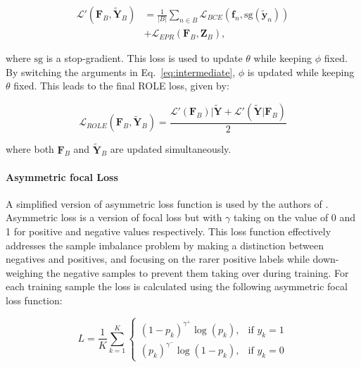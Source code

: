 \documentclass[lettersize,journal]{IEEEtran}
\begin{document}
\begin{equation}
    \label{eq:intermediate}
    \begin{aligned}
        \mathcal{L}'(\mathbf{F}_B,\tilde{\mathbf{Y}}_B) &= \frac{1}{|B|}\sum_{n\in B} \mathcal{L}_{BCE}(\mathbf{f}_n,\text{sg}(\tilde{\mathbf{y}}_n)) \\
        &+ \mathcal{L}_{EPR}(\mathbf{F}_B,\mathbf{Z}_B)\text{,}
    \end{aligned}
\end{equation}

\noindent where $\text{sg}$ is a stop-gradient. This loss is used to update $\theta$ while keeping $\phi$ fixed. By switching the arguments in Eq.~\ref{eq:intermediate}, $\phi$ is updated while keeping $\theta$ fixed. This leads to the final ROLE loss, given by:

\begin{equation}
    \label{eq:role}
    \mathcal{L}_{ROLE}(\mathbf{F}_B, \mathbf{\tilde{Y}}_B) = \frac{\mathcal{L}'(\mathbf{F}_B)|\mathbf{\tilde{Y}}+\mathcal{L}'(\mathbf{\tilde{Y}}|\mathbf{F}_B)}{2}
\end{equation}

\noindent where both $\mathbf{F}_B$ and $\tilde{\mathbf{Y}}_B$ are updated simultaneously.

\paragraph{Asymmetric focal Loss}
\label{sec:afl}
A simplified version of asymmetric loss function is used by the authors of \cite{Query2Label}. Asymmetric loss is a version of focal loss but with $\gamma$ taking on the value of 0 and 1 for positive and negative values respectively. This loss function effectively addresses the sample imbalance problem by making a distinction between negatives and positives, and focusing on the rarer positive labels while down-weighing the negative samples to prevent them taking over during training. For each training sample the loss is calculated using the following asymmetric focal loss function:

\begin{equation}
    L = \frac{1}{K} \sum_{k=1}^{K}
\begin{cases}
(1 - p_k)^{\gamma^+} \log(p_k), & \text{if } y_k = 1 \\
(p_k)^{\gamma^-} \log(1 - p_k), & \text{if } y_k = 0
\end{cases}
\end{equation}
\end{document}
